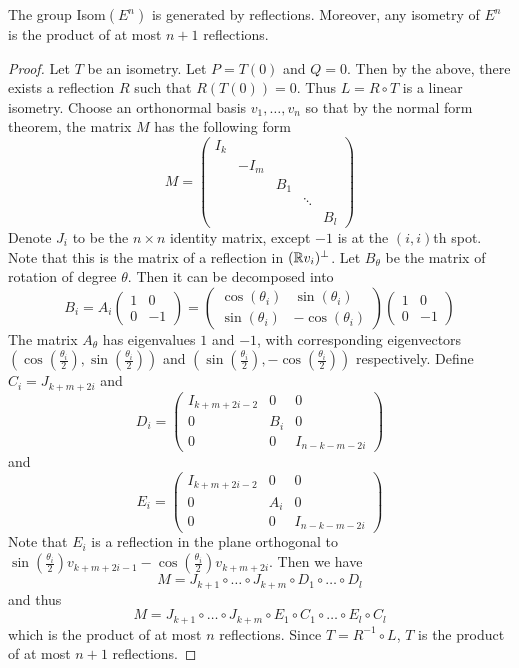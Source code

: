 \documentclass[a4paper]{article}
\begin{document}
\begin{thm}{}{} The group Isom$(E^n)$ is generated by reflections. Moreover, any isometry of $E^n$ is the product of at most $n+1$ reflections. \tcbline
\begin{proof} Let $T$ be an isometry. Let $P=T(0)$ and $Q=0$. Then by the above, there exists a reflection $R$ such that $R(T(0))=0$. Thus $L=R\circ T$ is a linear isometry. Choose an orthonormal basis $v_1,\dots,v_n$ so that by the normal form theorem, the matrix $M$ has the following form $$M=\begin{pmatrix}
I_k &&&&\\
&-I_m&&&\\
&&B_1&&\\
&&&\ddots&\\
&&&&B_l
\end{pmatrix}$$
Denote $J_i$ to be the $n\times n$ identity matrix, except $-1$ is at the $(i,i)$th spot. Note that this is the matrix of a reflection in $(\mathbb{R} v_i)^\perp$. Let $B_\theta$ be the matrix of rotation of degree $\theta$. Then it can be decomposed into $$B_i=A_i\begin{pmatrix}
1 & 0\\
0 & -1
\end{pmatrix}=\begin{pmatrix}
\cos(\theta_i) & \sin(\theta_i)\\
\sin(\theta_i) & -\cos(\theta_i)
\end{pmatrix}\begin{pmatrix}
1 & 0\\
0 & -1
\end{pmatrix}$$
The matrix $A_\theta$ has eigenvalues $1$ and $-1$, with corresponding eigenvectors $\left(\cos\left(\frac{\theta_i}{2}\right),\sin\left(\frac{\theta_i}{2}\right)\right)$ and $\left(\sin\left(\frac{\theta_i}{2}\right),-\cos\left(\frac{\theta_i}{2}\right)\right)$ respectively. \linebreak\linebreak
Define $C_i=J_{k+m+2i}$ and $$D_i=\begin{pmatrix}
I_{k+m+2i-2} & 0 & 0\\
0 & B_i & 0\\
0 & 0 & I_{n-k-m-2i}
\end{pmatrix}$$ and $$E_i=\begin{pmatrix}
I_{k+m+2i-2} & 0 & 0\\
0 & A_i & 0\\
0 & 0 & I_{n-k-m-2i}
\end{pmatrix}$$
Note that $E_i$ is a reflection in the plane orthogonal to $\sin\left(\frac{\theta_i}{2}\right)v_{k+m+2i-1}-\cos\left(\frac{\theta_i}{2}\right)v_{k+m+2i}$. Then we have $$M=J_{k+1}\circ\dots\circ J_{k+m}\circ D_1\circ\dots\circ D_l$$ and thus $$M=J_{k+1}\circ\dots\circ J_{k+m}\circ E_1\circ C_1\circ\dots\circ E_l\circ C_l$$ which is the product of at most $n$ reflections. Since $T=R^{-1}\circ L$, $T$ is the product of at most $n+1$ reflections. 
\end{proof}
\end{thm}
\end{document}
